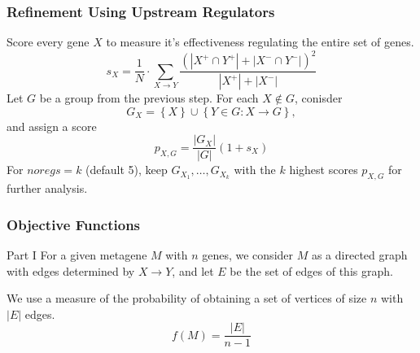 \documentclass[
	11pt, %
]{beamer}
\begin{document}
\begin{frame}
    \frametitle{Refinement Using Upstream Regulators}

    Score every gene $X$ to measure it's effectiveness regulating the entire set of genes.
    \begin{equation*}
        s_X = \frac{1}{N} \cdot \sum_{X \rightarrow Y}\frac{\left( \left| X^{+} \cap Y^{+}\right| + \left| X^{-} \cap Y^{-}\right| \right)^2}{\left| X^{+} \right| + \left| X^{-} \right|}
    \end{equation*}
    Let $G$ be a group from the previous step. For each $X \notin G$, conisder
    \begin{equation*}
        G_X = \left\{ X \right\} \cup \left\{ Y \in G : X \rightarrow G \right\},
    \end{equation*}
    and assign a score
    \begin{equation*}
        p_{X,G}=\frac{\left| G_X \right|}{\left| G \right|}(1+s_X)
    \end{equation*}
    For $noregs=k$ (default 5), keep $G_{X_1}, \ldots, G_{X_k}$ with the $k$ highest scores $p_{X,G}$ for further analysis.
\end{frame}

\begin{frame}
    \frametitle{Objective Functions}
    \begin{block}{Part I}
        For a given metagene $M$ with $n$ genes, we consider $M$ as a directed graph with edges determined by $X \rightarrow Y$, and let $E$ be the set of edges of this graph.
        
        \smallskip
        
        We use a measure of the probability of obtaining a set of vertices of size $n$ with $\left| E \right|$ edges.
        \begin{equation*}
            f(M) = \frac{\left| E \right|}{n-1}
        \end{equation*}
    \end{block}
\end{frame}
\end{document}
